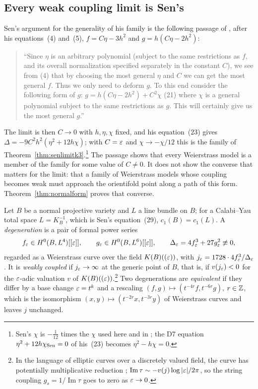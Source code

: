 \subsection{Every weak coupling limit is Sen's}\label{ssec:normalform}

Sen's argument for the generality of his family is the following passage of \cite{Sen97orientifold}, after his equations~(4) and~(5), $f=C\eta-3h^2$ and $g=h(C\eta-2h^2)$:
\begin{quote}\small
``Since $\eta$ is an arbitrary polynomial (subject to the same restrictions as $f$, and its overall normalization specified separately in the constant $C$), we see from (4) that by choosing the most general $\eta$ and $C$ we can get the most general $f$. Thus we only need to deform $g$. To this end consider the following form of $g$: $g=h(C\eta-2h^2)+C^2\chi$ (21) where $\chi$ is a general polynomial subject to the same restrictions as $g$. This will certainly give us the most general $g$.''
\end{quote}
The limit is then $C\to0$ with $h,\eta,\chi$ fixed, and his equation~(23) gives $\Delta=-9C^2h^2(\eta^2+12h\chi)$; with $C=\varepsilon$ and $\chi\to-\chi/12$ this is the family of Theorem~\ref{thm:senlimitk3}.\footnote{Sen's $\chi$ is $-\tfrac1{12}$ times the $\chi$ used here and in \cite{HLS18}; the D7 equation $\eta^2+12h\chi_{\rm Sen}=0$ of his~(23) becomes $\eta^2-h\chi=0$.} The passage shows that every Weierstrass model is a member of the family for some value of $C\ne0$. It does not show the converse that matters for the limit: that a family of Weierstrass models whose coupling becomes weak must approach the orientifold point along a path of this form. Theorem~\ref{thm:normalform} proves that converse.

Let $B$ be a normal projective variety and $L$ a line bundle on $B$; for a Calabi--Yau total space $L=K_B^{-1}$, which is Sen's equation~(29), $c_1(B)=c_1(L)$. A \emph{degeneration} is a pair of formal power series
\[
f_\varepsilon\in H^0(B,L^4)[[\varepsilon]],\qquad g_\varepsilon\in H^0(B,L^6)[[\varepsilon]],\qquad \Delta_\varepsilon=4f_\varepsilon^3+27g_\varepsilon^2\not\equiv0,
\]
regarded as a Weierstrass curve over the field $K(B)((\varepsilon))$, with $j_\varepsilon=1728\cdot4f_\varepsilon^3/\Delta_\varepsilon$. It is \emph{weakly coupled} if $j_\varepsilon\to\infty$ at the generic point of $B$, that is, if $v(j_\varepsilon)<0$ for the $\varepsilon$-adic valuation $v$ of $K(B)((\varepsilon))$.\footnote{In the language of elliptic curves over a discretely valued field, the curve has potentially multiplicative reduction \cite[Prop.~VII.5.5]{Silverman09}; $\operatorname{Im}\tau\sim-v(j)\log|\varepsilon|/2\pi$, so the string coupling $g_s=1/\operatorname{Im}\tau$ goes to zero as $\varepsilon\to0$.} Two degenerations are \emph{equivalent} if they differ by a base change $\varepsilon=t^k$ and a rescaling $(f,g)\mapsto(t^{-4r}f,t^{-6r}g)$, $r\in\mathbb{Z}$, which is the isomorphism $(x,y)\mapsto(t^{-2r}x,t^{-3r}y)$ of Weierstrass curves and leaves $j$ unchanged.

